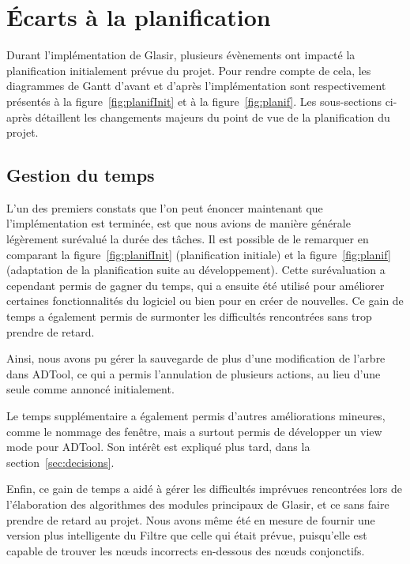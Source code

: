 \section{Écarts à la planification}
\label{sec:ecarts}

Durant l'implémentation de Glasir, plusieurs évènements ont impacté la planification initialement prévue du projet. Pour rendre compte de cela, les diagrammes de Gantt d'avant et d'après l'implémentation sont respectivement présentés à la {\sc figure}~\ref{fig:planifInit} et à la {\sc figure}~\ref{fig:planif}. Les sous-sections ci-après détaillent les changements majeurs du point de vue de la planification du projet. 

\subsection{Gestion du temps}
\label{ssec:temps}

L'un des premiers constats que l'on peut énoncer maintenant que l'implémentation est terminée, est que nous avions de manière générale légèrement surévalué la durée des tâches. Il est possible de le remarquer en comparant la {\sc figure}~\ref{fig:planifInit} (planification initiale) et la {\sc figure}~\ref{fig:planif} (adaptation de la planification suite au développement). Cette surévaluation a cependant permis de gagner du temps, qui a ensuite été utilisé pour améliorer certaines fonctionnalités du logiciel ou bien pour en créer de nouvelles. Ce gain de temps a également permis de surmonter les difficultés rencontrées sans trop prendre de retard.

Ainsi, nous avons pu gérer la sauvegarde de plus d'une modification de l'arbre dans ADTool, ce qui a permis l'annulation de plusieurs actions, au lieu d'une seule comme annoncé initialement.

Le temps supplémentaire a également permis d'autres améliorations mineures, comme le nommage des fenêtre, mais a surtout permis de développer un \og view mode \fg{} pour ADTool. Son intérêt est expliqué plus tard, dans la {\sc section}~\ref{sec:decisions}.

Enfin, ce gain de temps a aidé à gérer les difficultés imprévues rencontrées lors de l'élaboration des algorithmes des modules principaux de Glasir, et ce sans faire prendre de retard au projet. Nous avons même été en mesure de fournir une version plus intelligente du Filtre que celle qui était prévue, puisqu'elle est capable de trouver les n\oe{}uds incorrects en-dessous des n\oe{}uds conjonctifs.

